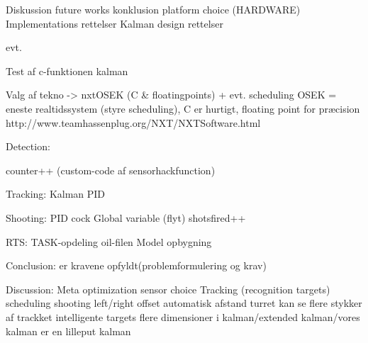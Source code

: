 Diskussion
future works
konklusion
platform choice (HARDWARE)
Implementations rettelser
Kalman design rettelser

evt.

Test af c-funktionen kalman



Valg af tekno -> nxtOSEK (C & floatingpoints) + evt. scheduling
OSEK = eneste realtidssystem (styre scheduling), C er hurtigt, floating point for præcision
http://www.teamhassenplug.org/NXT/NXTSoftware.html

Detection:

counter++
(custom-code af sensorhackfunction)


Tracking:
Kalman
PID


Shooting:
PID
cock
Global variable (flyt)
shotsfired++


RTS:
TASK-opdeling
oil-filen
Model opbygning


Conclusion:
er kravene opfyldt(problemformulering og krav)


Discussion:
Meta optimization
sensor choice
Tracking (recognition targets)
scheduling
shooting left/right
offset
automatisk afstand
turret kan se flere stykker af trackket
intelligente targets
flere dimensioner i kalman/extended kalman/vores kalman er en lilleput kalman
